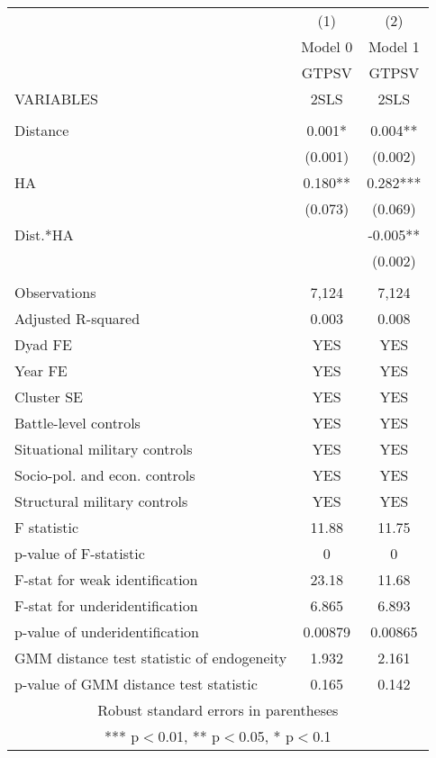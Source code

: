 \documentclass[]{article}
\begin{document}
\begin{tabular}{lcc} \hline
 & (1) & (2) \\
 & Model 0 & Model 1 \\
 & GTPSV & GTPSV \\
VARIABLES & 2SLS & 2SLS \\ \hline
 &  &  \\
Distance & 0.001* & 0.004** \\
 & (0.001) & (0.002) \\
HA & 0.180** & 0.282*** \\
 & (0.073) & (0.069) \\
Dist.*HA &  & -0.005** \\
 &  & (0.002) \\
 &  &  \\
Observations & 7,124 & 7,124 \\
Adjusted R-squared & 0.003 & 0.008 \\
Dyad FE & YES & YES \\
Year FE & YES & YES \\
Cluster SE & YES & YES \\
Battle-level controls & YES & YES \\
Situational military controls & YES & YES \\
Socio-pol. and econ. controls & YES & YES \\
Structural military controls & YES & YES \\
F statistic & 11.88 & 11.75 \\
p-value of F-statistic & 0 & 0 \\
F-stat for weak identification & 23.18 & 11.68 \\
F-stat for underidentification & 6.865 & 6.893 \\
p-value of underidentification & 0.00879 & 0.00865 \\
GMM distance test statistic of endogeneity & 1.932 & 2.161 \\
 p-value of GMM distance test statistic & 0.165 & 0.142 \\ \hline
\multicolumn{3}{c}{ Robust standard errors in parentheses} \\
\multicolumn{3}{c}{ *** p$<$0.01, ** p$<$0.05, * p$<$0.1} \\
\end{tabular}
\end{document}
